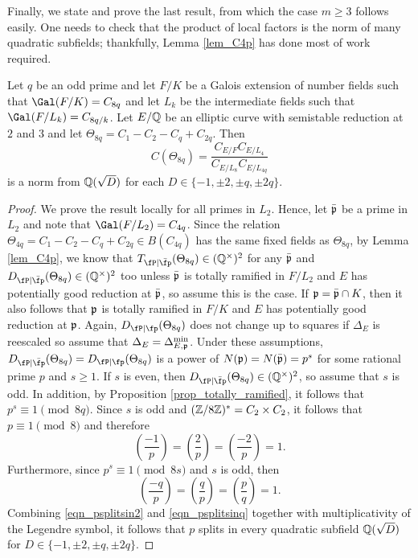 Finally, we state and prove the last result, from which the case $m\geq3$ follows easily. One needs to check that the product of local factors is the norm of many quadratic subfields; thankfully, Lemma \ref{lem_C4p} has done most of work required.

\begin{lemma}\label{lem_C8p}
    Let $q$ be an odd prime and let $F/K$ be a Galois extension of number fields such that $\Gal(F/K)=C_{8q}$ and let $L_k$ be the intermediate fields such that $\Gal(F/L_k)=C_{8q/k}$. Let $E/\mathbb{Q}$ be an elliptic curve with semistable reduction at $2$ and $3$ and let $\Theta_{8q}=C_1-C_2-C_q+C_{2q}$. Then 
    $$C(\Theta_{8q})=\frac{C_{E/F}C_{E/L_4}}{C_{E/L_8}C_{E/L_{4q}}}$$
    is a norm from $\mathbb{Q}(\sqrt{D})$ for each $D\in\{-1,\pm2,\pm q,\pm 2q\}$.
\end{lemma}

\begin{proof}
    We prove the result locally for all primes in $L_2$. Hence, let $\bar{\mathfrak{p}}$ be a prime in $L_2$ and note that $\Gal(F/L_2)=C_{4q}$. Since the relation $\Theta_{4q}=C_1-C_2-C_q+C_{2q}\in B(C_{4q})$ has the same fixed fields as $\Theta_{8q}$, by Lemma \ref{lem_C4p}, we know that $\Tpb(\Theta_{8q})\in\QQss$ for any $\bar{\mathfrak{p}}$ and $\Dpb(\Theta_{8q})\in\QQss$ too unless $\bar{\mathfrak{p}}$ is totally ramified in $F/L_2$ and $E$ has potentially good reduction at $\bar{\mathfrak{p}}$, so assume this is the case. If $\mathfrak{p}=\bar{\mathfrak{p}}\cap K$, then it also follows that $\mathfrak{p}$ is totally ramified in $F/K$ and $E$ has potentially good reduction at $\mathfrak{p}$. Again, $\Dp(\Theta_{8q})$ does not change up to squares if $\Delta_{E}$ is reescaled so assume that $\Delta_{E}=\Delta_{E,\mathfrak{p}}^{\min}$. Under these assumptions, $\Dpb(\Theta_{8q})=\Dp(\Theta_{8q})$ is a power of $N(\mathfrak{p})=N(\bar{\mathfrak{p}})=p^s$ for some rational prime $p$ and $s\geq1$. If $s$ is even, then $\Dpb(\Theta_{8q})\in\QQss$, so assume that $s$ is odd. In addition, by Proposition \ref{prop_totally_ramified}, it follows that $p^s\equiv 1\pmod{8q}$. Since $s$ is odd and $(\mathbb{Z}/8\mathbb{Z})^*=C_2\times C_2$, it follows that $p\equiv 1\pmod{8}$ and therefore
    \begin{equation}\label{eqn_psplitsin2}
        \left(\frac{-1}{p}\right)=\left(\frac{2}{p}\right)=\left(\frac{-2}{p}\right)=1.
    \end{equation}
    Furthermore, since $p^s\equiv1\pmod{8s}$ and $s$ is odd, then 
    \begin{equation}\label{eqn_psplitsinq}
        \left(\frac{-q}{p}\right)=\left(\frac{q}{p}\right)=\left(\frac{p}{q}\right)=1.
    \end{equation}
    Combining \eqref{eqn_psplitsin2} and \eqref{eqn_psplitsinq} together with multiplicativity of the Legendre symbol, it follows that $p$ splits in every quadratic subfield $\mathbb{Q}(\sqrt{D})$ for $D\in\{-1,\pm2,\pm q,\pm2q\}$.
\end{proof}


